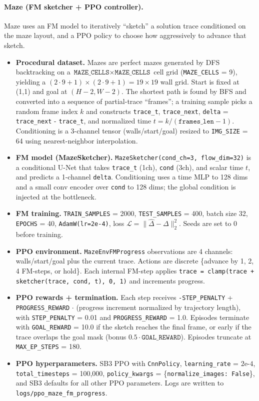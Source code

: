 \documentclass{l4proj}
\begin{document}
\paragraph{Maze (FM sketcher + PPO controller).}
Maze uses an FM model to iteratively ``sketch'' a solution trace conditioned on the maze layout, and a PPO policy to choose how aggressively to advance that sketch.
\begin{itemize}
    \item \textbf{Procedural dataset.} Mazes are perfect mazes generated by DFS backtracking on a $\texttt{MAZE\_CELLS} \times \texttt{MAZE\_CELLS}$ cell grid (\texttt{MAZE\_CELLS} = 9), yielding a $(2 \cdot 9+1) \times (2 \cdot 9+1) = 19 \times 19$ wall grid. Start is fixed at (1,1) and goal at $(H-2,W-2)$. The shortest path is found by BFS and converted into a sequence of partial-trace ``frames''; a training sample picks a random frame index $k$ and constructs \texttt{trace\_t}, \texttt{trace\_next}, \texttt{delta} = \texttt{trace\_next} - \texttt{trace\_t}, and normalized time $t = k / (\texttt{frames\_len} - 1)$. Conditioning is a 3-channel tensor (walls/start/goal) resized to \texttt{IMG\_SIZE} = 64 using nearest-neighbor interpolation.
    \item \textbf{FM model (MazeSketcher).} \texttt{MazeSketcher(cond\_ch=3, flow\_dim=32)} is a conditional U-Net that takes \texttt{trace\_t} (1ch), \texttt{cond} (3ch), and scalar time $t$, and predicts a 1-channel \texttt{delta}. Conditioning uses a time MLP to 128 dims and a small conv encoder over \texttt{cond} to 128 dims; the global condition is injected at the bottleneck.
    \item \textbf{FM training.} \texttt{TRAIN\_SAMPLES} = 2000, \texttt{TEST\_SAMPLES} = 400, batch size 32, \texttt{EPOCHS} = 40, \texttt{AdamW(lr=2e-4)}, loss $\mathcal{L} = \|\widehat{\Delta} - \Delta\|_2^2$. Seeds are set to 0 before training.
    \item \textbf{PPO environment.} \texttt{MazeEnvFMProgress} observations are 4 channels: walls/start/goal plus the current trace. Actions are discrete \{advance by 1, 2, 4 FM-steps, or hold\}. Each internal FM-step applies \texttt{trace = clamp(trace + sketcher(trace, cond, t), 0, 1)} and increments progress.
    \item \textbf{PPO rewards + termination.} Each step receives \texttt{-STEP\_PENALTY} + \texttt{PROGRESS\_REWARD} $\cdot$ (progress increment normalized by trajectory length), with \texttt{STEP\_PENALTY} = 0.01 and \texttt{PROGRESS\_REWARD} = 1.0. Episodes terminate with \texttt{GOAL\_REWARD} = 10.0 if the sketch reaches the final frame, or early if the trace overlaps the goal mask (bonus $0.5 \cdot \texttt{GOAL\_REWARD}$). Episodes truncate at \texttt{MAX\_EP\_STEPS} = 180.
    \item \textbf{PPO hyperparameters.} SB3 PPO with \texttt{CnnPolicy}, \texttt{learning\_rate} = $\text{2e-4}$, \\ \texttt{total\_timesteps} = 100{,}000, \texttt{policy\_kwargs} = \{\texttt{normalize\_images: False}\}, and SB3 defaults for all other PPO parameters. Logs are written to \texttt{logs/\allowbreak ppo\_maze\_fm\_\allowbreak progress}.
\end{itemize}
\end{document}

